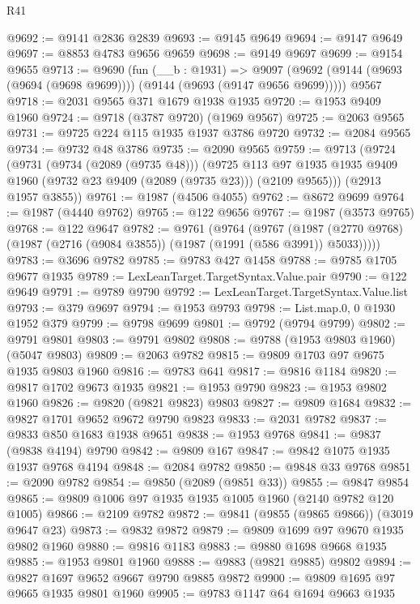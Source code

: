 \begin{lexlean}{R41}
\begin{coremodule}
@9692 := @9141 @2836 @2839
@9693 := @9145 @9649
@9694 := @9147 @9649
@9697 := @8853 @4783 @9656 @9659
@9698 := @9149 @9697
@9699 := @9154 @9655
@9713 := @9690
    (fun (__b : @1931) =>
    @9097 (@9692 (@9144 (@9693 (@9694 (@9698 @9699)))) (@9144 (@9693 (@9147 @9656 @9699)))))
    @9567
@9718 := @2031 @9565 @371 @1679 @1938 @1935
@9720 := @1953 @9409 @1960
@9724 := @9718 (@3787 @9720) (@1969 @9567)
@9725 := @2063 @9565
@9731 := @9725 @224 @115 @1935 @1937 @3786 @9720
@9732 := @2084 @9565
@9734 := @9732 @48 @3786
@9735 := @2090 @9565
@9759 := @9713
    (@9724
      (@9731
        (@9734 (@2089 (@9735 @48)))
        (@9725
          @113
          @97
          @1935
          @1935
          @9409
          @1960
          (@9732 @23 @9409 (@2089 (@9735 @23)))
          (@2109 @9565)))
      (@2913 @1957 @3855))
@9761 := @1987 (@4506 @4055)
@9762 := @8672 @9699
@9764 := @1987 (@4440 @9762)
@9765 := @122 @9656
@9767 := @1987 (@3573 @9765)
@9768 := @122 @9647
@9782 := @9761
    (@9764
      (@9767
        (@1987 (@2770 @9768) (@1987 (@2716 (@9084 @3855)) (@1987 (@1991 (@586 @3991)) @5033)))))
@9783 := @3696 @9782
@9785 := @9783 @427 @1458
@9788 := @9785 @1705 @9677 @1935
@9789 := LexLeanTarget.TargetSyntax.Value.pair
@9790 := @122 @9649
@9791 := @9789 @9790
@9792 := LexLeanTarget.TargetSyntax.Value.list
@9793 := @379 @9697
@9794 := @1953 @9793
@9798 := List.map.{0, 0} @1930 @1952 @379
@9799 := @9798 @9699
@9801 := @9792 (@9794 @9799)
@9802 := @9791 @9801
@9803 := @9791 @9802
@9808 := @9788 (@1953 @9803 @1960) (@5047 @9803)
@9809 := @2063 @9782
@9815 := @9809 @1703 @97 @9675 @1935 @9803 @1960
@9816 := @9783 @641
@9817 := @9816 @1184
@9820 := @9817 @1702 @9673 @1935
@9821 := @1953 @9790
@9823 := @1953 @9802 @1960
@9826 := @9820 (@9821 @9823) @9803
@9827 := @9809 @1684
@9832 := @9827 @1701 @9652 @9672 @9790 @9823
@9833 := @2031 @9782
@9837 := @9833 @850 @1683 @1938 @9651
@9838 := @1953 @9768
@9841 := @9837 (@9838 @4194) @9790
@9842 := @9809 @167
@9847 := @9842 @1075 @1935 @1937 @9768 @4194
@9848 := @2084 @9782
@9850 := @9848 @33 @9768
@9851 := @2090 @9782
@9854 := @9850 (@2089 (@9851 @33))
@9855 := @9847 @9854
@9865 := @9809 @1006 @97 @1935 @1935 @1005 @1960 (@2140 @9782 @120 @1005)
@9866 := @2109 @9782
@9872 := @9841 (@9855 (@9865 @9866)) (@3019 @9647 @23)
@9873 := @9832 @9872
@9879 := @9809 @1699 @97 @9670 @1935 @9802 @1960
@9880 := @9816 @1183
@9883 := @9880 @1698 @9668 @1935
@9885 := @1953 @9801 @1960
@9888 := @9883 (@9821 @9885) @9802
@9894 := @9827 @1697 @9652 @9667 @9790 @9885 @9872
@9900 := @9809 @1695 @97 @9665 @1935 @9801 @1960
@9905 := @9783 @1147 @64 @1694 @9663 @1935

\end{coremodule}
\end{lexlean}
